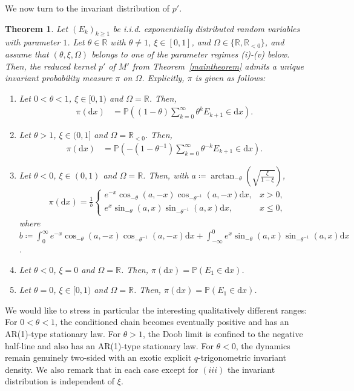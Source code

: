 \documentclass[10pt,a4paper]{amsart}
\newcommand{\R}{\mathbb{R}} %
\renewcommand{\P}{\mathbb{P}} %
\newcommand{\1}{\mathds{1}}
\renewcommand{\d}{\mathrm{d}}
\newtheorem{Theorem}[definition]{Theorem}
\begin{document}
We now turn to the invariant distribution of $p'$.
\begin{Theorem}\label{invariant_distribution}
  Let $(E_k)_{k\ge1}$ be i.i.d. exponentially distributed random variables with parameter $1$.    Let $\theta\in\R$ with $\theta\neq1$, $\xi\in[0,1]$, and
$\Omega\in\{\R,\R_{<0}\}$, and assume that
$(\theta,\xi,\Omega)$ belongs to one of the parameter regimes
 (i)-(v) below. Then, the reduced  kernel $p'$ of $M'$ from Theorem~\ref{maintheorem} admits a unique invariant probability measure $\pi$ on $\Omega$.
Explicitly, $\pi$ is given as follows:
    \begin{enumerate}[label=(\roman*)]
     \item  Let $0<\theta<1$, $\xi\in[0,1)$ and $\Omega=\R$. Then, 
     \begin{align}\label{inv_distr_i}
         \pi(\d x) 
         &= \P\left( (1-\theta)\sum_{k=0}^\infty\theta^kE_{k+1} \in\d x \right).
     \end{align}
     \item  Let $\theta>1$, $\xi\in(0,1]$ and $\Omega=\R_{<0}$. Then, 
     \begin{align*}
        \pi(\d x) 
       &= \P\left( -(1-\theta^{-1}) \sum_{k=0}^\infty\theta^{-k}E_{k+1} \in\d x \right).
     \end{align*}
 \item Let $\theta <0$, $\xi\in(0,1)$ and $\Omega=\R$. Then, with $a\coloneqq \arctan_{-\theta}\left(\sqrt{\frac{\xi}{1-\xi}}\right)$,
\begin{align*}
    &\pi(\d x) =\frac{1}{b}
    \begin{cases} e^{-x} \cos_{-\theta}\left(a,-x\right) \cos_{- \theta^{-1}}\left(a,-x\right)\d x, &x>0,\\ e^x \sin_{-\theta}\left(a,x\right) \sin_{- \theta^{-1}}\left(a,x\right)\d x, &x\leq0, \end{cases}
\end{align*}
where $b\!\coloneqq \!\int_0^\infty e^{-x}\! \cos_{-\theta}(a,-x) \cos_{-\theta^{-1}}(a,-x)\d x + \int_{-\infty}^0 e^x \!\sin_{-\theta}(a,x) \sin_{-\theta^{-1}}(a,x)\d x$.
 \item Let $\theta <0$, $\xi=0$ and $\Omega=\R$. Then, 
  $\pi(\d x) =\P(E_1\in\d x)$.
 \item Let $\theta=0$, $\xi\in[0,1)$ and $\Omega=\R$. Then, 
  $\pi(\d x) =\P(E_1\in\d x)$.
\end{enumerate}
\end{Theorem}
    We would like to stress in particular the interesting qualitatively different ranges: For $0<\theta<1$, the conditioned chain becomes eventually positive and has an AR(1)-type stationary law. For $\theta>1$, the Doob limit is confined to the negative half-line and also has an AR(1)-type stationary law. For $\theta<0$, the dynamics remain genuinely two-sided with an exotic explicit $q$-trigonometric invariant density.
    We also remark that in each case except for $(iii)$ the invariant distribution is independent of $\xi$.
\end{document}
